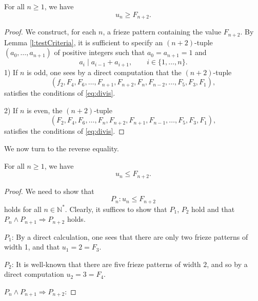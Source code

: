 \begin{lemma}
    \label{l:unLB}
    For all $n \geq 1$, we have 
    \[
        u_n \geq F_{n+2}.
    \]
\end{lemma}
\begin{proof}
    We construct, for each $n$, a frieze pattern containing the value $F_{n+2}$. By Lemma \ref{l:testCriteria}, 
    it is sufficient to specify an $(n+2)$-tuple $(a_0, \ldots, a_{n+1})$ of positive integers such that $a_0 = a_{n+1} =1$ and 
    \begin{equation}\label{eq:divis}
        a_i \mid a_{i-1} + a_{i+1}, \qquad i \in \{1, \ldots, n\}.
    \end{equation}
    1) If $n$ is odd, one sees by a direct computation that the $(n+2)$-tuple 
    \[
        (f_2,F_4, F_6, \ldots, F_{n+1}, F_{n+2}, F_n, F_{n-2}, \ldots, F_5, F_3, F_1), 
    \]
    satisfies the conditions of \eqref{eq:divis}. 

    2) If $n$ is even, the $(n+2)$-tuple 
    \[
        (F_2, F_4, F_6, \ldots, F_n, F_{n+2}, F_{n+1}, F_{n-1}, \ldots, F_5, F_3,F_1),
    \]
    satisfies the conditions of \eqref{eq:divis}. 
\end{proof}

We now turn to the reverse equality.
\begin{proposition}
    \label{l:unUB}
    For all $n \geq 1$, we have 
    \[
        u_n \leq F_{n+2}.
    \]
\end{proposition}
\begin{proof}
    We need to show that
    \[
        P_n : u_n \leq F_{n+2}
    \]
    holds for all $n \in \mathbb{N}^*$. Clearly, it suffices to show that $P_1$, $P_2$ hold and that $P_n \wedge P_{n+1} \Rightarrow P_{n+2}$
    holds. 
    
    $P_1$: By a direct calculation, one sees that there are only two frieze patterns of width 1, and that $u_1 = 2 = F_3$. 

    $P_2$: It is well-known that there are five frieze patterns of width $2$, and so by a direct computation $u_2 = 3 = F_4$. 

    $P_n \wedge P_{n+1} \Rightarrow P_{n+2}$: 
\end{proof}